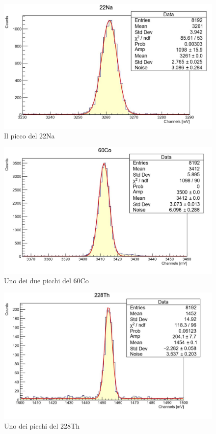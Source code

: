 \documentclass[a4paper,10pt]{article}
\begin{document}
\begin{figure}[h!]
    \centering
    \includegraphics[scale=0.45]{grafici/piccoNa}
    \caption{Il picco del 22Na}
\end{figure}

\begin{figure}[h!]
    \centering
    \includegraphics[scale=0.45]{grafici/piccoCo}
    \caption{Uno dei due picchi del 60Co}
\end{figure}

\begin{figure}[h!]
    \centering
    \includegraphics[scale=0.45]{grafici/piccoTh}
    \caption{Uno dei picchi del 228Th}
\end{figure}
\end{document}
